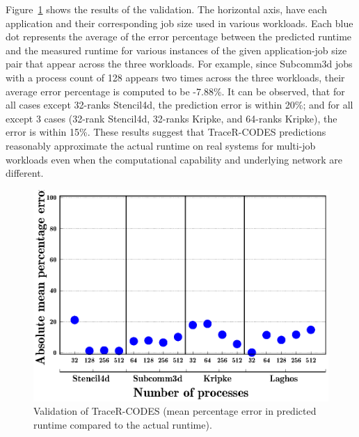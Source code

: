 Figure~\ref{fig:validation} shows the results of the validation. The
horizontal axis, have each application and their corresponding job size used
in various workloads. Each blue dot represents the average 
of the error percentage between the predicted runtime and the measured runtime
for various
instances of the given application-job size pair that appear across the three workloads. For
example, since Subcomm3d jobs with a process count of 128 appears two times
across the three workloads, their average error percentage is computed to be
-7.88\%. It can be observed, that for all cases except 32-ranks
Stencil4d, the prediction error is within 20\%; and for all except 3 cases
(32-rank Stencil4d, 32-ranks Kripke, and 64-ranks Kripke), the error is within 15\%.
These results suggest that TraceR-CODES predictions reasonably approximate 
the actual runtime on real systems for multi-job workloads even when the
computational capability and underlying network are different.

\begin{figure}[!htbp]
\centering
\includegraphics[width=\columnwidth]{figure/val/quartz.eps}
\caption{Validation of TraceR-CODES (mean percentage error in predicted runtime compared to the actual runtime).}
\label{fig:validation}
\end{figure}

